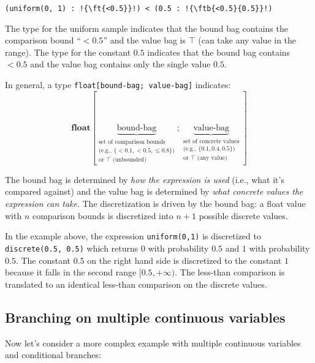 \begin{lstlisting}[aboveskip=1em,belowskip=1em,escapechar=!]
    (uniform(0, 1) : !{\ft{<0.5}}!) < (0.5 : !{\ftb{<0.5}{0.5}}!)
\end{lstlisting}

The type  for the uniform sample indicates that the bound bag contains the comparison bound ``$<\!\!0.5$'' and the value bag is $\top$ (can take any value in the range). 
The type  for the constant $0.5$ indicates that the bound bag contains $<0.5$ and the value bag contains only the single value $0.5$.

In general, a type \lstinline{float[bound-bag; value-bag]} indicates:
\[
\textbf{float}
[
\underbrace{\text{bound-bag}}_{\begin{array}{c}\text{set of comparison bounds}\\\text{(e.g., }\{<\!0.1, <\!0.5, \leq\!0.8\}\text{)}\\\text{or }\top\text{ (unbounded)}\end{array}}
;
\underbrace{\text{value-bag}}_{\begin{array}{c}\text{set of concrete values}\\\text{(e.g., }\{0.1, 0.4, 0.5\}\text{)}\\\text{or }\top\text{ (any value)}\end{array}}
]
\]

The bound bag is determined by \emph{how the expression is used} (i.e., what it's compared against) and the value bag is determined by \emph{what concrete values the expression can take}.
The discretization is driven by the bound bag: a float value with $n$ comparison bounds is discretized into $n+1$ possible discrete values.

In the example above, the expression \lstinline{uniform(0,1)} is discretized to \lstinline{discrete(0.5, 0.5)} which returns $0$ with probability $0.5$ and $1$ with probability $0.5$.
The constant $0.5$ on the right hand side is discretized to the constant $1$ because it falls in the second range $[0.5, +\infty)$. The less-than comparison is translated to an identical less-than comparison on the discrete values.

\subsection{Branching on multiple continuous variables}

\noindent Now let's consider a more complex example with multiple continuous variables and conditional branches:

